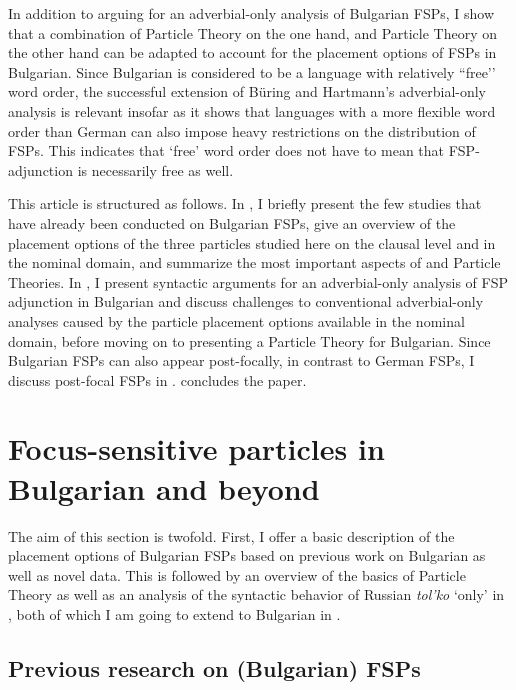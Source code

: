 \documentclass[output=paper,colorlinks,citecolor=brown]{langscibook}
\begin{document}
In addition to arguing for an adverbial-only analysis of Bulgarian FSPs, I show that a combination of  Particle Theory on the one hand, and  Particle Theory on the other hand can be adapted to account for the placement options of FSPs in Bulgarian. Since Bulgarian is considered to be a language with relatively ``free'’ word order, the successful extension of Büring and Hartmann’s adverbial-only analysis is relevant insofar as it shows that languages with a more flexible word order than German can also impose heavy restrictions on the distribution of FSPs. This indicates that `free’ word order does not have to mean that FSP-adjunction is necessarily free as well. \par 
This article is structured as follows. In , I briefly present the few studies that have already been conducted on Bulgarian FSPs, give an overview of the placement options of the three particles studied here on the clausal level and in the nominal domain, and summarize the most important aspects of  and  Particle Theories. In , I present syntactic arguments for an adverbial-only analysis of FSP adjunction in Bulgarian and discuss challenges to conventional adverbial-only analyses caused by the particle placement options available in the nominal domain, before moving on to presenting a Particle Theory for Bulgarian. Since Bulgarian FSPs can also appear post-focally, in contrast to German FSPs, I discuss post-focal FSPs in .  concludes the paper.

\section{Focus-sensitive particles in Bulgarian and beyond}\label{sec:2}
The aim of this section is twofold. First, I offer a basic description of the placement options of Bulgarian FSPs based on previous work on Bulgarian as well as novel data. This is followed by an overview of the basics of  Particle Theory as well as an analysis of the syntactic behavior of Russian \textit{tol'ko} `only' in \citet{Zanon2018}, both of which I am going to extend to Bulgarian in . 
\subsection{Previous research on (Bulgarian) FSPs}\label{sec:2.1} 
\end{document}
